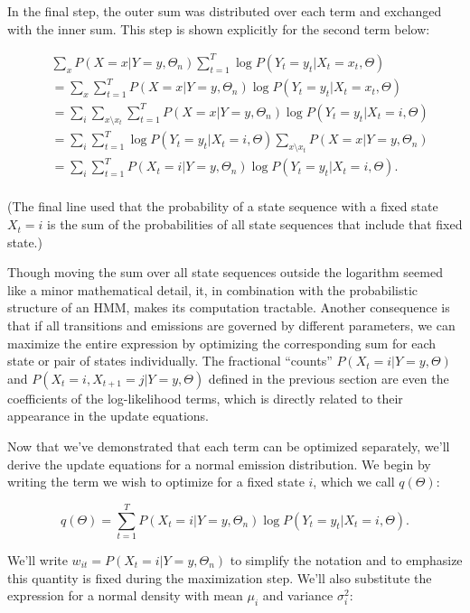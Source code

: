 In the final step, the outer sum was distributed over each term and exchanged with the inner sum. This step is shown explicitly for the second term below:

\begin{align*}
& \sum_x P(X=x|Y=y, \Theta_n) \sum_{t=1}^T \log P(Y_t=y_t|X_t=x_t, \Theta) \\
&= \sum_x \sum_{t=1}^T P(X=x|Y=y, \Theta_n) \log P(Y_t=y_t|X_t=x_t, \Theta) \\
&= \sum_i \sum_{x \setminus x_t} \sum_{t=1}^T P(X=x|Y=y, \Theta_n) \log P(Y_t=y_t|X_t=i, \Theta) \\
&= \sum_i \sum_{t=1}^T \log P(Y_t=y_t|X_t=i, \Theta) \sum_{x \setminus x_t} P(X=x|Y=y, \Theta_n) \\
&= \sum_i \sum_{t=1}^T P(X_t=i|Y=y, \Theta_n) \log P(Y_t=y_t|X_t=i, \Theta). \\
\end{align*}

(The final line used that the probability of a state sequence with a fixed state $X_t=i$ is the sum of the probabilities of all state sequences that include that fixed state.)

Though moving the sum over all state sequences outside the logarithm seemed like a minor mathematical detail, it, in combination with the probabilistic structure of an HMM, makes its computation tractable. Another consequence is that if all transitions and emissions are governed by different parameters, we can maximize the entire expression by optimizing the corresponding sum for each state or pair of states individually. The fractional ``counts'' $P(X_t=i|Y=y, \Theta)$ and $P(X_t=i, X_{t+1}=j|Y=y, \Theta)$ defined in the previous section are even the coefficients of the log-likelihood terms, which is directly related to their appearance in the update equations.

Now that we've demonstrated that each term can be optimized separately, we'll derive the update equations for a normal emission distribution. We begin by writing the term we wish to optimize for a fixed state $i$, which we call $q(\Theta)$:

\begin{equation*}
q(\Theta) = \sum_{t=1}^T P(X_t=i|Y=y, \Theta_n) \log P(Y_t=y_t|X_t=i, \Theta).
\end{equation*}

We'll write $w_{it} = P(X_t=i|Y=y, \Theta_n)$ to simplify the notation and to emphasize this quantity is fixed during the maximization step. We'll also substitute the expression for a normal density with mean $\mu_i$ and variance $\sigma_i^2$:

